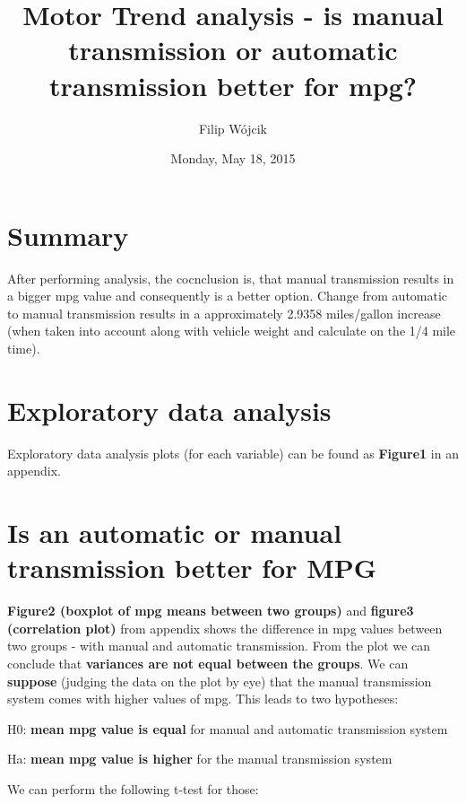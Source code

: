 \documentclass[10pt,]{article}
\title{Motor Trend analysis - is manual transmission or automatic transmission
better for mpg?}
\author{Filip Wójcik}
\date{Monday, May 18, 2015}
\newenvironment{Shaded}{\begin{snugshade}}{\end{snugshade}}
\newcommand{\KeywordTok}[1]{\textcolor[rgb]{0.13,0.29,0.53}{\textbf{{#1}}}}
\newcommand{\DataTypeTok}[1]{\textcolor[rgb]{0.13,0.29,0.53}{{#1}}}
\newcommand{\DecValTok}[1]{\textcolor[rgb]{0.00,0.00,0.81}{{#1}}}
\newcommand{\StringTok}[1]{\textcolor[rgb]{0.31,0.60,0.02}{{#1}}}
\newcommand{\OtherTok}[1]{\textcolor[rgb]{0.56,0.35,0.01}{{#1}}}
\newcommand{\NormalTok}[1]{{#1}}
\begin{document}
\maketitle


\section{Summary}\label{summary}

After performing analysis, the cocnclusion is, that manual transmission
results in a bigger mpg value and consequently is a better option.
Change from automatic to manual transmission results in a approximately
2.9358 miles/gallon increase (when taken into account along with vehicle
weight and calculate on the 1/4 mile time).

\section{Exploratory data analysis}\label{exploratory-data-analysis}

Exploratory data analysis plots (for each variable) can be found as
\textbf{Figure1} in an appendix.

\section{Is an automatic or manual transmission better for
MPG}\label{is-an-automatic-or-manual-transmission-better-for-mpg}

\textbf{Figure2 (boxplot of mpg means between two groups)} and
\textbf{figure3 (correlation plot)} from appendix shows the difference
in mpg values between two groups - with manual and automatic
transmission. From the plot we can conclude that \textbf{variances are
not equal between the groups}. We can \textbf{suppose} (judging the data
on the plot by eye) that the manual transmission system comes with
higher values of mpg. This leads to two hypotheses:

H0: \textbf{mean mpg value is equal} for manual and automatic
transmission system

Ha: \textbf{mean mpg value is higher} for the manual transmission system

We can perform the following t-test for those:

\begin{Shaded}
\end{Shaded}
\end{document}
